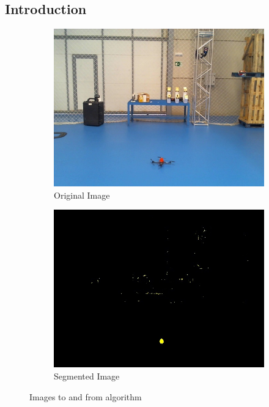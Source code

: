 \subsection{Introduction}
	\begin{figure}[h]
		\centering
		\begin{subfigure}{0.49\linewidth}
			\includegraphics[width=\linewidth]{../Images/c4/image_ori}
			\caption{Original Image}
			\label{fig:image_ori}
		\end{subfigure}
		\begin{subfigure}{0.49\linewidth}
			\includegraphics[width=\linewidth]{../Images/c4/image_seg}
			\caption{Segmented Image}
			\label{fig:image_seg}
		\end{subfigure}
		\caption{Images to and from algorithm}
		\label{fig:frames_PC}
	\end{figure}

